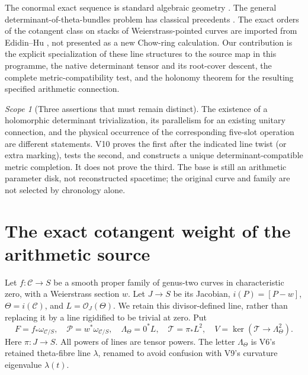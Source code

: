 \documentclass[11pt]{article}
\theoremstyle{definition}
\theoremstyle{remark}
\newtheorem{scope}[scope]{Scope}
\begin{document}
The conormal exact sequence is standard algebraic geometry
\cite{StacksCartier}. The general determinant-of-theta-bundles problem has
classical precedents \cite{KouvidakisTheta}. The exact orders of the
cotangent class on stacks of Weierstrass-pointed curves are imported from
Edidin--Hu \cite{EdidinHu}, not presented as a new Chow-ring calculation.
Our contribution is the explicit specialization of these line structures
to the source map in this programme, the native determinant tensor and
its root-cover descent, the complete metric-compatibility test, and the
holonomy theorem for the resulting specified arithmetic connection.

\begin{scope}[Three assertions that must remain distinct]
The existence of a holomorphic determinant trivialization, its parallelism
for an existing unitary connection, and the physical occurrence of the
corresponding five-slot operation are different statements. V10 proves the
first after the indicated line twist (or extra marking), tests the second,
and constructs a unique determinant-compatible metric completion. It does
not prove the third. The base is still an arithmetic parameter disk, not
reconstructed spacetime; the original curve and family are not selected by
chronology alone.
\end{scope}

\section{The exact cotangent weight of the arithmetic source}
\label{sec:v10-lines}

Let $f:\mathcal C\to S$ be a smooth proper family of genus-two curves in
characteristic zero, with a Weierstrass section $w$. Let $J\to S$ be its
Jacobian, $i(P)=[P-w]$, $\Theta=i(\mathcal C)$, and
$L=\mathcal O_J(\Theta)$. We retain this divisor-defined line, rather
than replacing it by a line rigidified to be trivial at zero. Put
\[
 F=f_*\omega_{\mathcal C/S},\quad
 \mathscr P=w^*\omega_{\mathcal C/S},\quad
 \Lambda_\Theta=0^*L,\quad
 \mathcal T=\pi_*L^2,\quad
 V=\ker(\mathcal T\to\Lambda_\Theta^2).
\]
Here $\pi:J\to S$. All powers of lines are tensor powers. The letter
$\Lambda_\Theta$ is V6's retained theta-fibre line $\lambda$, renamed to
avoid confusion with V9's curvature eigenvalue $\lambda(t)$.
\end{document}
